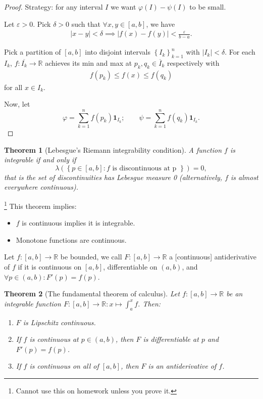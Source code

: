 \documentclass[12pt]{article}
\newtheorem*{theorem}{Theorem}
\newcommand{\R}{\mathbb{R}}
\newcommand{\ol}{\overline}
\begin{document}
  \begin{proof}
    Strategy: for any interval $I$ we want $\varphi(I) - \psi(I)$ to be small.

    Let $\varepsilon > 0$.  Pick $\delta > 0$ such that $\forall x, y \in [a, b]$, we have
    \begin{align*}
      |x - y| < \delta \implies |f(x) - f(y)| < \frac{\varepsilon}{b-a}.
    \end{align*}

    Pick a partition of $[a, b]$ into disjoint intervals $\left\{ I_k \right\}_{k=1}^{n}$ with $|I_k| < \delta$.  For each $I_k$, $f: \ol{I_k} \to \R$ achieves its min and max at $p_k, q_k \in \ol{I}_k$ respectively with
    \begin{align*}
      f(p_k) \leq f(x) \leq f(q_k)
    \end{align*}
    for all $x \in I_k$.

    Now, let
    \[
      \varphi = \sum_{k=1}^{n} f(p_k) \mathbf{1}_{I_k}; \qquad \psi = \sum_{k=1}^{n} f(q_k) \mathbf{1}_{I_k}.
    \]



  \end{proof}

  \begin{theorem}[Lebesgue's Riemann integrability condition]
    A function $f$ is integrable if and only if
    \[
      \lambda \left( \left\{ p \in [a, b]: f \text{ is discontinuous at p } \right\} \right) = 0,
      \]
      that is the set of discontinuities has Lebesgue measure 0 (alternatively, $f$ is almost everywhere continuous).
  \end{theorem}

  \footnote{Cannot use this on homework unless you prove it.} This theorem implies:
  \begin{itemize}
    \item $f$ is continuous implies it is integrable.
    \item Monotone functions are continuous.
  \end{itemize}

  Let $f: [a, b] \to \R$ be bounded, we call $F:[a, b] \to \R$ a [continuous] antiderivative of $f$ if it is continuous on $[a, b]$, differentiable on $(a, b)$, and $\forall p \in (a, b): F'(p) = f(p)$.

  \begin{theorem}[The fundamental theorem of calculus]
    Let $f:[a, b] \to \R$ be an integrable function $F:[a, b] \to \R : x \mapsto \int_{a}^{x} f$.  Then:
    \begin{enumerate}
      \item $F$ is Lipschitz continuous.
      \item If $f$ is continuous at $p \in (a, b)$, then $F$ is differentiable at $p$ and $F'(p) = f(p)$.
      \item If $f$ is continuous on all of $[a, b]$, then $F$ is an antiderivative of $f$.
    \end{enumerate}
  \end{theorem}
\end{document}
